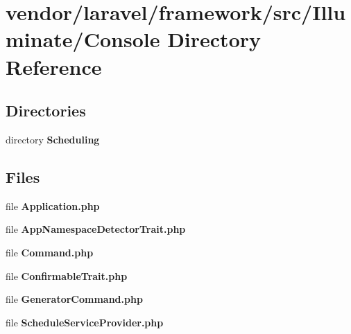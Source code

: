 \section{vendor/laravel/framework/src/\+Illuminate/\+Console Directory Reference}
\label{dir_98d8b0227b9c3178f86adb4467e3e001}
\subsection*{Directories}
\begin{DoxyCompactItemize}
\item 
directory {\bf Scheduling}
\end{DoxyCompactItemize}
\subsection*{Files}
\begin{DoxyCompactItemize}
\item 
file {\bf Application.\+php}
\item 
file {\bf App\+Namespace\+Detector\+Trait.\+php}
\item 
file {\bf Command.\+php}
\item 
file {\bf Confirmable\+Trait.\+php}
\item 
file {\bf Generator\+Command.\+php}
\item 
file {\bf Schedule\+Service\+Provider.\+php}
\end{DoxyCompactItemize}
